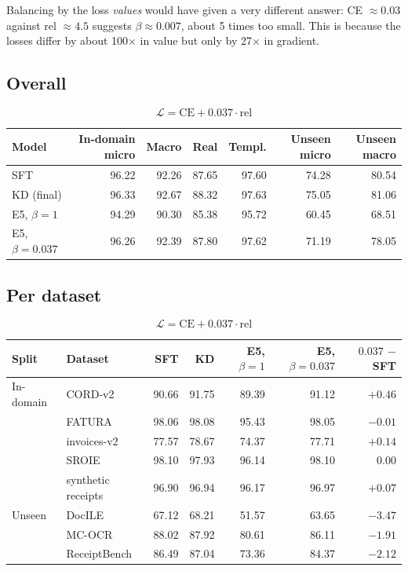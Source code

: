 \documentclass[10pt]{article}
\newcommand{\losssmall}{\[ \mathcal{L} = \mathrm{CE} + 0.037 \cdot \mathrm{rel} \]}
\begin{document}
Balancing by the loss \emph{values} would have given a very different answer: CE $\approx 0.03$ against rel $\approx 4.5$ suggests $\beta \approx 0.007$, about 5 times too small. This is because the losses differ by about 100$\times$ in value but only by 27$\times$ in gradient.

\subsection*{Overall}
\losssmall
\begin{center}
\begin{tabular}{lrrrrrr}
\toprule
Model & In-domain micro & Macro & Real & Templ. & Unseen micro & Unseen macro \\
\midrule
SFT & 96.22 & 92.26 & 87.65 & 97.60 & 74.28 & 80.54 \\
KD (final) & 96.33 & 92.67 & 88.32 & 97.63 & 75.05 & 81.06 \\
E5, $\beta = 1$ & 94.29 & 90.30 & 85.38 & 95.72 & 60.45 & 68.51 \\
E5, $\beta = 0.037$ & 96.26 & 92.39 & 87.80 & 97.62 & 71.19 & 78.05 \\
\bottomrule
\end{tabular}
\end{center}

\subsection*{Per dataset}
\losssmall
\begin{center}
\begin{tabular}{llrrrrr}
\toprule
Split & Dataset & SFT & KD & E5, $\beta = 1$ & E5, $\beta = 0.037$ & $0.037$ $-$ SFT \\
\midrule
In-domain & CORD-v2 & 90.66 & 91.75 & 89.39 & 91.12 & $+0.46$ \\
 & FATURA & 98.06 & 98.08 & 95.43 & 98.05 & $-0.01$ \\
 & invoices-v2 & 77.57 & 78.67 & 74.37 & 77.71 & $+0.14$ \\
 & SROIE & 98.10 & 97.93 & 96.14 & 98.10 & $0.00$ \\
 & synthetic receipts & 96.90 & 96.94 & 96.17 & 96.97 & $+0.07$ \\
\midrule
Unseen & DocILE & 67.12 & 68.21 & 51.57 & 63.65 & $-3.47$ \\
 & MC-OCR & 88.02 & 87.92 & 80.61 & 86.11 & $-1.91$ \\
 & ReceiptBench & 86.49 & 87.04 & 73.36 & 84.37 & $-2.12$ \\
\bottomrule
\end{tabular}
\end{center}
\end{document}
